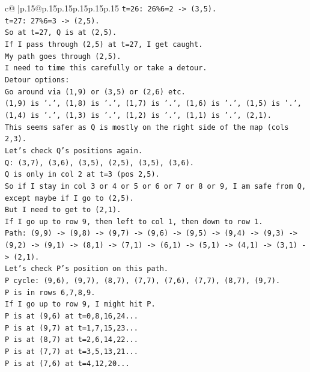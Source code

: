 \documentclass{article}
\begin{document}
{\begin{supertabular}{c@{$\;$}|p{.15\linewidth}@{}p{.15\linewidth}p{.15\linewidth}p{.15\linewidth}p{.15\linewidth}p{.15\linewidth}}
{{{\texttt{t=26: 26\%6=2 {-}> (3,5).} \\
\texttt{t=27: 27\%6=3 {-}> (2,5).} \\
\texttt{So at t=27, Q is at (2,5).} \\
\texttt{If I pass through (2,5) at t=27, I get caught.} \\
\texttt{My path goes through (2,5).} \\
\texttt{I need to time this carefully or take a detour.} \\
\texttt{Detour options:} \\
\texttt{Go around via (1,9) or (3,5) or (2,6) etc.} \\
\texttt{(1,9) is '.', (1,8) is '.', (1,7) is '.', (1,6) is '.', (1,5) is '.', (1,4) is '.', (1,3) is '.', (1,2) is '.', (1,1) is '.', (2,1).} \\
\texttt{This seems safer as Q is mostly on the right side of the map (cols 2,3).} \\
\texttt{Let's check Q's positions again.} \\
\texttt{Q: (3,7), (3,6), (3,5), (2,5), (3,5), (3,6).} \\
\texttt{Q is only in col 2 at t=3 (pos 2,5).} \\
\texttt{So if I stay in col 3 or 4 or 5 or 6 or 7 or 8 or 9, I am safe from Q, except maybe if I go to (2,5).} \\
\texttt{But I need to get to (2,1).} \\
\texttt{If I go up to row 9, then left to col 1, then down to row 1.} \\
\texttt{Path: (9,9) {-}> (9,8) {-}> (9,7) {-}> (9,6) {-}> (9,5) {-}> (9,4) {-}> (9,3) {-}> (9,2) {-}> (9,1) {-}> (8,1) {-}> (7,1) {-}> (6,1) {-}> (5,1) {-}> (4,1) {-}> (3,1) {-}> (2,1).} \\
\texttt{Let's check P's position on this path.} \\
\texttt{P cycle: (9,6), (9,7), (8,7), (7,7), (7,6), (7,7), (8,7), (9,7).} \\
\texttt{P is in rows 6,7,8,9.} \\
\texttt{If I go up to row 9, I might hit P.} \\
\texttt{P is at (9,6) at t=0,8,16,24...} \\
\texttt{P is at (9,7) at t=1,7,15,23...} \\
\texttt{P is at (8,7) at t=2,6,14,22...} \\
\texttt{P is at (7,7) at t=3,5,13,21...} \\
\texttt{P is at (7,6) at t=4,12,20...} \\
}}}
\end{supertabular}}
\end{document}
